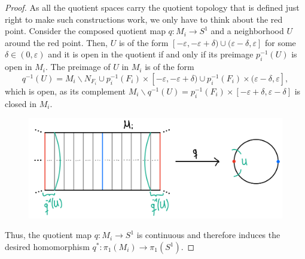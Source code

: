 \begin{proof}
    \noindent
    As all the quotient spaces carry the quotient topology that is defined just right to make such constructions work, we only have to think about the red point.
    Consider the composed quotient map \(q : M_i \to S^1\) and a neighborhood \(U\) around the red point.
    Then, \(U\) is of the form \([-\varepsilon, -\varepsilon + \delta) \cup (\varepsilon - \delta, \varepsilon]\) for some \(\delta \in (0, \varepsilon)\) and it is open in the quotient if and only if its preimage \(p_i^{-1}(U)\) is open in \(M_i\).
    The preimage of \(U\) in \(M_i\) is of the form
    \[q^{-1}(U) = M_i \backslash N_{F_i} \cup p_i^{-1}(F_i) \times [-\varepsilon, -\varepsilon + \delta) \cup p_i^{-1}(F_i) \times (\varepsilon - \delta, \varepsilon],\]
    which is open, as its complement \(M_i \backslash q^{-1}(U) = p_i^{-1}(F_i) \times [-\varepsilon + \delta, \varepsilon - \delta]\) is closed in \(M_i\).
    \begin{figure}[h!]
        \label{img:quotientnbhd}
        \centering
        \includegraphics[width=.5\textwidth]{gfx/Quotient neighborhood .png}
    \end{figure}\vspace*{-2\parskip}

    \noindent
    Thus, the quotient map \(q : M_i \to S^1\) is continuous and therefore induces the desired homomorphism \(q^* : \pi_1(M_i) \to \pi_1(S^1)\).
\end{proof}




